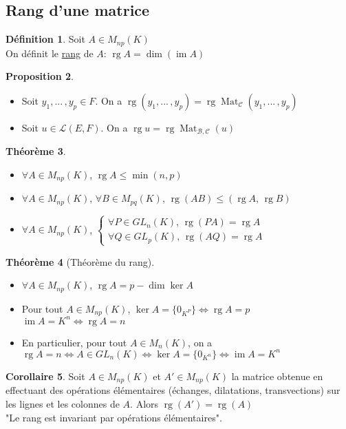\documentclass[10pt,a4paper]{article}
\theoremstyle{definition}
\newtheorem{proposition}{Proposition}[section]
\newtheorem{theorem}[proposition]{Théorème}
\newtheorem{corollaire}[proposition]{Corollaire}
\newtheorem{definition}[proposition]{Définition}
\DeclareMathOperator{\rg}{rg}
\DeclareMathOperator{\im}{im}
\DeclareMathOperator{\Mat}{Mat}
\begin{document}
\subsection{Rang d'une matrice}
\begin{definition}
Soit $A \in M_{np}(K)$ \\
On définit le \uline{rang} de $A$: $\rg A = \dim (\im A)$
\end{definition}
\begin{proposition}
\hfill
\begin{itemize}
\item Soit $y_1, ...\, , y_p \in F$. On a $\rg (y_1, ...\, , y_p) = \rg \Mat_\mathcal{C} (y_1, ...\, , y_p)$
\item Soit $u \in \mathcal{L}(E, F)$. On a $\rg u = \rg \Mat_{\mathcal{B}, \mathcal{C}}(u)$
\end{itemize}
\end{proposition}
\begin{theorem}
\hfill
\begin{itemize}
\item $\forall A \in M_{np}(K)$, $\rg A \leq \min (n, p)$
\item $\forall A \in M_{np}(K)$, $\forall B \in M_{pq}(K)$, $\rg (AB) \leq (\rg A, \, \rg B)$
\item $\forall A \in M_{np}(K)$, $\begin{cases}
\forall P \in GL_n(K),\, \rg (PA) = \rg A \\
\forall Q \in GL_p(K),\, \rg (AQ) = \rg A
\end{cases}$
\end{itemize}
\end{theorem}

\pagebreak

\begin{theorem}[Théorème du rang]
\hfill
\begin{itemize}
\item $\forall A \in M_{np}(K)$, $\rg A = p - \dim \ker A$
\item Pour tout $A \in M_{np}(K)$, $\ker A = \{ 0_{K^P} \} \iff \rg A = p$ \\
 $\im A = K^n \iff \rg A = n$
\item En particulier, pour tout $A \in M_n(K)$, on a \\
$\rg A = n \iff A \in GL_n(K) \iff \ker A = \{0_{K^n}\} \iff \im A = K^n$
\end{itemize}
\end{theorem}
\begin{corollaire}
Soit $A \in M_{np}(K)$ et $A' \in M_{np}(K)$ la matrice obtenue en effectuant des opérations élémentaires (échanges, dilatations, transvections) sur les lignes et les colonnes de $A$. Alors $\rg (A') = \rg (A)$ \\
"Le rang est invariant par opérations élémentaires".
\end{corollaire}
\end{document}
